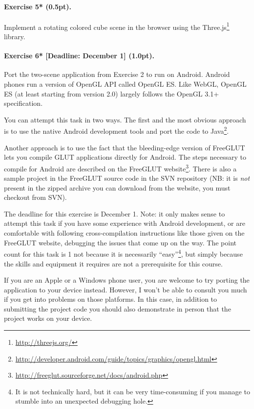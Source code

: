 \documentclass{article}
\newenvironment{exercise}[2]{\paragraph{Exercise #1 (#2pt).} }{
\medskip}
\begin{document}
\begin{exercise}{5*}{0.5}
Implement a rotating colored cube scene in the browser using the Three.js\footnote{\url{http://threejs.org/}} library.
\end{exercise}

\begin{exercise}{6* [Deadline: December 1]}{1.0}
Port the two-scene application from Exercise 2 to run on Android. Android phones run a version of OpenGL API called OpenGL ES. Like WebGL, OpenGL ES (at least starting from version 2.0) largely follows the OpenGL 3.1+ specification.

You can attempt this task in two ways. The first and the most obvious approach is to use the native Android development tools and port the code to Java\footnote{\url{http://developer.android.com/guide/topics/graphics/opengl.html}}.

Another approach is to use the fact that the bleeding-edge version of FreeGLUT lets you compile GLUT applications directly for Android. The steps necessary to compile for Android are described on the FreeGLUT website\footnote{\url{http://freeglut.sourceforge.net/docs/android.php}}. There is also a sample project in the FreeGLUT source code in the SVN repository (NB: it is \emph{not} present in the zipped archive you can download from the website, you must checkout from SVN). 

The deadline for this exercise is December 1. Note: it only makes sense to attempt this task if you have some experience with Android development, or are comfortable with following cross-compilation instructions like those given on the FreeGLUT website, debugging the issues that come up on the way. The point count for this task is 1 not because it is necessarily ``easy''\footnote{It is not technically hard, but it can be very time-consuming if you manage to stumble into an unexpected debugging hole.}, but simply because the skills and equipment it requires are not a prerequisite for this course.

If you are an Apple or a Windows phone user, you are welcome to try porting the application to your device instead. However, I won't be able to consult you much if you get into problems on those platforms. In this case, in addition to submitting the project code you should also demonstrate in person that the project works on your device.
\end{exercise}
\end{document}
